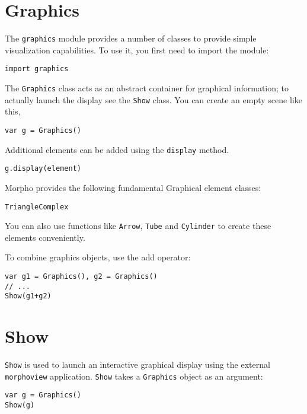 \hypertarget{graphics}{%
\section{Graphics}\label{graphics}}

The \texttt{graphics} module provides a number of classes to provide
simple visualization capabilities. To use it, you first need to import
the module:

\begin{lstlisting}
import graphics
\end{lstlisting}

The \texttt{Graphics} class acts as an abstract container for graphical
information; to actually launch the display see the \texttt{Show} class.
You can create an empty scene like this,

\begin{lstlisting}
var g = Graphics()
\end{lstlisting}

Additional elements can be added using the \texttt{display} method.

\begin{lstlisting}
g.display(element)
\end{lstlisting}

Morpho provides the following fundamental Graphical element classes:

\begin{lstlisting}
TriangleComplex
\end{lstlisting}

You can also use functions like \texttt{Arrow}, \texttt{Tube} and
\texttt{Cylinder} to create these elements conveniently.

To combine graphics objects, use the add operator:

\begin{lstlisting}
var g1 = Graphics(), g2 = Graphics()
// ...
Show(g1+g2)
\end{lstlisting}

\hypertarget{show}{%
\section{Show}\label{show}}

\texttt{Show} is used to launch an interactive graphical display using
the external \texttt{morphoview} application. \texttt{Show} takes a
\texttt{Graphics} object as an argument:

\begin{lstlisting}
var g = Graphics()
Show(g)
\end{lstlisting}

